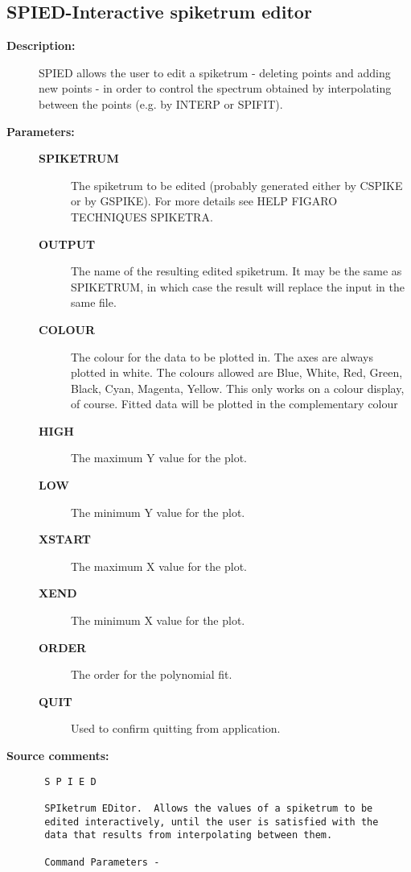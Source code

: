 \subsection{SPIED-\label{SPIED}Interactive spiketrum editor}
\begin{description}

\item [{\bf Description:}]
 SPIED allows the user to edit a spiketrum - deleting points and
 adding new points - in order to control the spectrum obtained
 by interpolating between the points (e.g. by INTERP or SPIFIT).

\item [{\bf Parameters:}]
\begin{description}
\item [{\bf SPIKETRUM}]
 The spiketrum to be edited (probably generated either by
 CSPIKE or by GSPIKE).  For more details see HELP FIGARO TECHNIQUES
 SPIKETRA.
\item [{\bf OUTPUT}]
 The name of the resulting edited spiketrum.  It may be the
 same as SPIKETRUM, in which case the result will replace the input in
 the same file.
\item [{\bf COLOUR}]
 The colour for the data to be plotted in.
 The axes are always plotted in white.  The colours allowed are Blue,
 White, Red, Green, Black, Cyan, Magenta, Yellow.  This only works on
 a colour display, of course.  Fitted data will be plotted in the
 complementary colour
\item [{\bf HIGH}]
 The maximum Y value for the plot.
\item [{\bf LOW}]
 The minimum Y value for the plot.
\item [{\bf XSTART}]
 The maximum X value for the plot.
\item [{\bf XEND}]
 The minimum X value for the plot.
\item [{\bf ORDER}]
 The order for the polynomial fit.
\item [{\bf QUIT}]
 Used to confirm quitting from application.
\end{description}

\item [{\bf Source comments:}]
\begin{verbatim}
 S P I E D

 SPIketrum EDitor.  Allows the values of a spiketrum to be
 edited interactively, until the user is satisfied with the
 data that results from interpolating between them.

 Command Parameters -


\end{verbatim}
\end{description}
